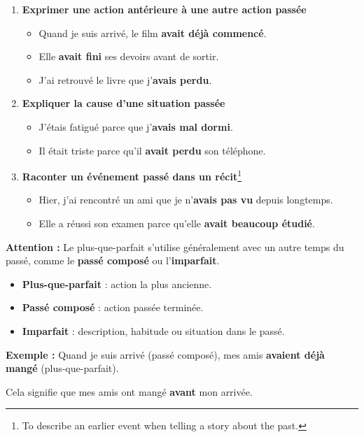 \documentclass[math,code]{amznotes}
\theoremstyle{remark}
\begin{document}
\begin{enumerate}
    \item \textbf{Exprimer une action antérieure à une autre action passée}
    \begin{itemize}
        \item Quand je suis arrivé, le film \textbf{avait déjà commencé}.
        \item Elle \textbf{avait fini} ses devoirs avant de sortir.
        \item J'ai retrouvé le livre que j'\textbf{avais perdu}.
    \end{itemize}

    \item \textbf{Expliquer la cause d'une situation passée}
    \begin{itemize}
        \item J'étais fatigué parce que j'\textbf{avais mal dormi}.
        \item Il était triste parce qu'il \textbf{avait perdu} son téléphone.
    \end{itemize}

    \item \textbf{Raconter un événement passé dans un récit}\footnote{To describe an earlier event when telling a story about the past.}
    \begin{itemize}
        \item Hier, j'ai rencontré un ami que je n'\textbf{avais pas vu} depuis longtemps.
        \item Elle a réussi son examen parce qu'elle \textbf{avait beaucoup étudié}.
    \end{itemize}
\end{enumerate}

\begin{notebox}
\textbf{Attention :} Le plus-que-parfait s'utilise généralement avec un autre temps du passé, comme le \textbf{passé composé} ou l'\textbf{imparfait}.

\begin{itemize}
    \item \textbf{Plus-que-parfait} : action la plus ancienne.
    \item \textbf{Passé composé} : action passée terminée.
    \item \textbf{Imparfait} : description, habitude ou situation dans le passé.
\end{itemize}

\textbf{Exemple :} Quand je suis arrivé (passé composé), mes amis \textbf{avaient déjà mangé} (plus-que-parfait).

Cela signifie que mes amis ont mangé \textbf{avant} mon arrivée.
\end{notebox}
\end{document}
